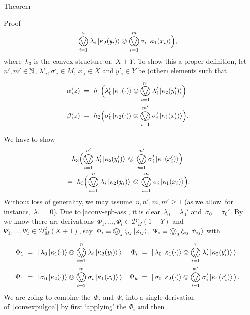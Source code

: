 \documentclass[b]{subfiles}
\begin{document}
\begin{parsec}
\begin{point}{Theorem}
\begin{point}{Proof}
\begin{equation}
    \bigovee^n_{i=1} \lambda_i \ket{\kappa_2(y_i)}
        \ovee \bigovee^m_{i=1} \sigma_i \ket{\kappa_1(x_i)}\Bigr),
\end{equation}
where~$h_3$ is the convex structure on~$X+Y$.
To show this a proper definition,
let~$n',m'\in \mathbb{N}$, $\lambda'_i, \sigma'_i \in M$,
$x'_i \in X$ and $y'_i \in Y$ be (other) elements such that
\begin{align*}
    \alpha(z) &\ =\ 
    h_1\Bigl(\lambda'_0 \ket{\kappa_1(\cdot)}
    \ovee \bigovee^{n'}_{i=1} \lambda'_i \ket{\kappa_2(y'_i)}\Bigr) \\
        \beta(z) &\ =\  h_2 \Bigl(\sigma'_0 \ket{\kappa_2(\cdot)}
    \ovee \bigovee^{m'}_{i=1} \sigma'_i \ket{\kappa_1(x'_i)}\Bigr).
\end{align*}
\begin{point}%
We have to show
\begin{multline}\label{convexpulgoal}
    h_3 \Bigl(
    \bigovee^{n'}_{i=1} \lambda'_i \ket{\kappa_2(y'_i)}
    \,\ovee\, \bigovee^{m'}_{i=1} \sigma'_i \ket{\kappa_1(x'_i)}\Bigr) \\
    \ = \ 
    h_3 \Bigl(
    \bigovee^n_{i=1} \lambda_i \ket{\kappa_2(y_i)}
        \,\ovee\, \bigovee^m_{i=1} \sigma_i \ket{\kappa_1(x_i)}\Bigr).
\end{multline}
Without loss of generality,
    we may assume~$n,n',m,m' \geq 1$
    (as we allow, for instance,~$\lambda_1=0$).
Due to \eqref{aconv-epb-ass},
 it is clear~$\lambda_0 = \lambda_0'$ and~$\sigma_0=\sigma_0'$.
By \sref{elements-coprod-conv}
    we know there
    are derivations~$\Phi_1, \ldots, \Phi_l \in \mathcal{D}_M^2 (1+Y)$
    and~$\Psi_1, \ldots, \Psi_k \in \mathcal{D}_M^2 (X+1)$,
    say~$\Phi_i \equiv \bigovee_j \zeta_{ij} \ket{\varphi_{ij}}$,
    $\Psi_i \equiv \bigovee_j \xi_{ij} \ket{\psi_{ij}}$
    with
\begin{align*}
    \Phi_1 &\ = \ \ket{\,
    \lambda_0 \ket{\kappa_1(\cdot)}
\ovee \bigovee^{n}_{i=1} \lambda_i \ket{\kappa_2(y_i)} \,} &
    \Phi_l &\ = \ \ket{\,
    \lambda_0 \ket{\kappa_1(\cdot)}
\ovee \bigovee^{n'}_{i=1} \lambda'_i \ket{\kappa_2(y'_i)} \,} \\
    \Psi_1 &\ = \ \ket{\,
    \sigma_0 \ket{\kappa_2(\cdot)}
\ovee \bigovee^{m}_{i=1} \sigma_i \ket{\kappa_1(x_i)} \,} &
    \Psi_k &\ = \ \ket{\,
    \sigma_0 \ket{\kappa_2(\cdot)}
\ovee \bigovee^{m'}_{i=1} \sigma'_i \ket{\kappa_1(x'_i)} \,}.
\end{align*}
We are going to combine the~$\Phi_i$ and~$\Psi_i$
into a single derivation of~\eqref{convexpulgoal}
    by first `applying' the $\Phi_i$ and then

\end{point}
\end{point}
\end{point}
\end{parsec}
\end{document}
